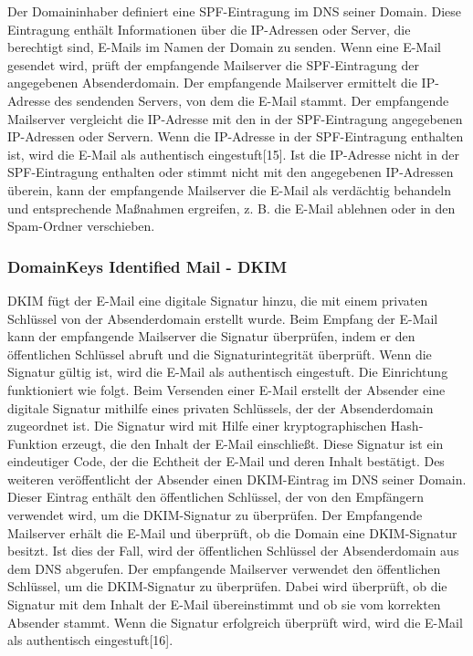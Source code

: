 \documentclass[journal=tosc,final]{iacrtrans}
\begin{document}
 Der Domaininhaber definiert eine SPF-Eintragung im DNS seiner Domain. Diese Eintragung enthält Informationen über die IP-Adressen oder Server, die berechtigt sind, E-Mails im Namen der Domain zu senden. Wenn eine E-Mail gesendet wird, prüft der empfangende Mailserver die SPF-Eintragung der angegebenen Absenderdomain. Der empfangende Mailserver ermittelt die IP-Adresse des sendenden Servers, von dem die E-Mail stammt. Der empfangende Mailserver vergleicht die IP-Adresse mit den in der SPF-Eintragung angegebenen IP-Adressen oder Servern. Wenn die IP-Adresse in der SPF-Eintragung enthalten ist, wird die E-Mail als authentisch eingestuft[15]. Ist die IP-Adresse nicht in der SPF-Eintragung enthalten oder stimmt nicht mit den angegebenen IP-Adressen überein, kann der empfangende Mailserver die E-Mail als verdächtig behandeln und entsprechende Maßnahmen ergreifen, z. B. die E-Mail ablehnen oder in den Spam-Ordner verschieben.
 \subsubsection{DomainKeys Identified Mail - DKIM}
 DKIM fügt der E-Mail eine digitale Signatur hinzu, die mit einem privaten Schlüssel von der Absenderdomain erstellt wurde. Beim Empfang der E-Mail kann der empfangende Mailserver die Signatur überprüfen, indem er den öffentlichen Schlüssel abruft und die Signaturintegrität überprüft. Wenn die Signatur gültig ist, wird die E-Mail als authentisch eingestuft. Die Einrichtung funktioniert wie folgt. Beim Versenden einer E-Mail erstellt der Absender eine digitale Signatur mithilfe eines privaten Schlüssels, der der Absenderdomain zugeordnet ist. Die Signatur wird mit Hilfe einer kryptographischen Hash-Funktion erzeugt, die den Inhalt der E-Mail einschließt. Diese Signatur ist ein eindeutiger Code, der die Echtheit der E-Mail und deren Inhalt bestätigt. Des weiteren veröffentlicht der Absender einen DKIM-Eintrag im DNS seiner Domain. Dieser Eintrag enthält den öffentlichen Schlüssel, der von den Empfängern verwendet wird, um die DKIM-Signatur zu überprüfen. Der Empfangende Mailserver erhält die E-Mail und überprüft, ob die Domain eine DKIM-Signatur besitzt. Ist dies der Fall,  wird der öffentlichen Schlüssel der Absenderdomain aus dem DNS abgerufen. Der empfangende Mailserver verwendet den öffentlichen Schlüssel, um die DKIM-Signatur zu überprüfen. Dabei wird überprüft, ob die Signatur mit dem Inhalt der E-Mail übereinstimmt und ob sie vom korrekten Absender stammt. Wenn die Signatur erfolgreich überprüft wird, wird die E-Mail als authentisch eingestuft[16].
\end{document}
